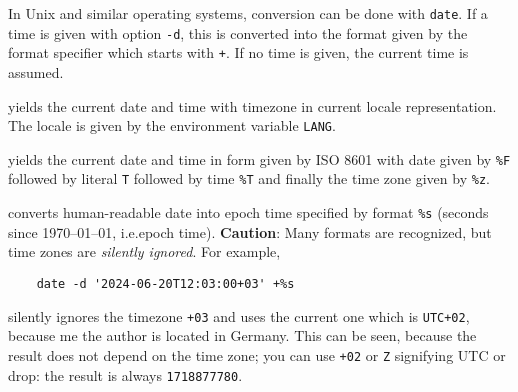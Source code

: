 \documentclass[a4paper, english]{article}%
\begin{document}
In Unix and similar operating systems, conversion can be done with \texttt{date}. 
If a time is given with option \texttt{-d}, 
this is converted into the format given by the format specifier which starts with \texttt{+}. 
If no time is given, the current time is assumed. 
%
\begin{description}[style=nextline]
  \item[\texttt{date}] 
  yields the current date and time with timezone in current locale representation. 
  The locale is given by the environment variable \texttt{LANG}. 
  \item[\texttt{date +\%FT\%T\%z}] 
  yields the current date and time 
  in form given by ISO 8601 with date given by \texttt{\%F} followed by literal \texttt{T} 
  followed by time \texttt{\%T} and finally the time zone given by \texttt{\%z}. 
  \item[\texttt{date -d 'Apr 29 2024' +\%s}] %
  converts human-readable date into epoch time specified by format \texttt{\%s} 
  (seconds since 1970--01--01, i.e.\@ epoch time). 
  \textbf{Caution}: Many formats are recognized, but time zones are \emph{silently ignored}. 
  For example, 
  \begin{verbatim}
    date -d '2024-06-20T12:03:00+03' +%s
  \end{verbatim}
  silently ignores the timezone \texttt{+03} 
  and uses the current one which is \texttt{UTC+02}, because me the author is located in Germany. 
  This can be seen, because the result does not depend on the time zone; 
  you can use \texttt{+02} or \texttt{Z} signifying UTC or drop: 
  the result is always \texttt{1718877780}. 
  

\end{description}
\end{document}
